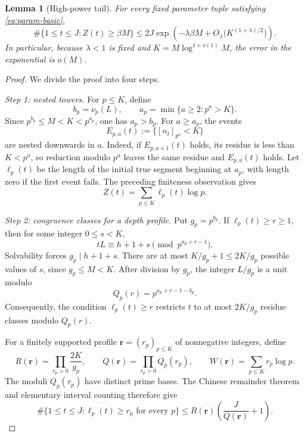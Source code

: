 \documentclass[10pt,a4paper]{amsart}
\newtheorem{lemma}{Lemma}
\begin{document}
\begin{lemma}[High-power tail]\label{lem:tail}
For every fixed parameter tuple satisfying \eqref{eq:param-basic},
\begin{equation}\label{eq:tail-bound}
 \#\{1\leq t\leq J:Z(t)\geq\beta M\}
 \leq
 2J\exp\!\left(-\lambda\beta M
       +O_\lambda\bigl(K^{(1+\lambda)/2}\bigr)\right).
\end{equation}
In particular, because \(\lambda<1\) is fixed and
\(K=M\log^{1+o(1)}M\), the error in the exponential is \(o(M)\).
\end{lemma}

\begin{proof}
We divide the proof into four steps.

\medskip
\noindent\emph{Step 1: nested towers.}
For \(p\leq K\), define
\begin{equation}\label{eq:b-a}
 b_p=\nu_p(L),
 \qquad
 a_p=\min\{a\geq2:p^a>K\}.
\end{equation}
Since \(p^{b_p}\leq M<K<p^{a_p}\), one has \(a_p>b_p\).
For \(a\geq a_p\), the events
\[
 E_{p,a}(t):=\{[n_t]_{p^a}<K\}
\]
are nested downwards in \(a\).  Indeed, if \(E_{p,a+1}(t)\) holds, its
residue is less than \(K<p^a\), so reduction modulo \(p^a\) leaves the
same residue and \(E_{p,a}(t)\) holds.  Let \(\ell_p(t)\) be the length of
the initial true segment beginning at \(a_p\), with length zero if the first
event fails.  The preceding finiteness observation gives
\begin{equation}\label{eq:Z-depth}
 Z(t)=\sum_{p\leq K}\ell_p(t)\log p.
\end{equation}

\medskip
\noindent\emph{Step 2: congruence classes for a depth profile.}
Put \(g_p=p^{b_p}\).  If \(\ell_p(t)\geq r\geq1\), then for some integer
\(0\leq s<K\),
\begin{equation}\label{eq:depth-congruence}
 tL\equiv h+1+s\pmod {p^{a_p+r-1}}.
\end{equation}
Solvability forces \(g_p\mid h+1+s\).  There are at most
\(K/g_p+1\leq2K/g_p\) possible values of \(s\), since
\(g_p\leq M<K\).  After division by \(g_p\), the integer \(L/g_p\) is a
unit modulo
\begin{equation}\label{eq:Qpr}
 Q_p(r)=p^{a_p+r-1-b_p}.
\end{equation}
Consequently, the condition \(\ell_p(t)\geq r\) restricts \(t\) to at
most \(2K/g_p\) residue classes modulo \(Q_p(r)\).

For a finitely supported profile
\(\mathbf r=(r_p)_{p\leq K}\) of nonnegative integers, define
\begin{equation}\label{eq:RQ}
 R(\mathbf r)=\prod_{r_p>0}\frac{2K}{g_p},
 \qquad
 Q(\mathbf r)=\prod_{r_p>0}Q_p(r_p),
 \qquad
 W(\mathbf r)=\sum_{p\leq K}r_p\log p.
\end{equation}
The moduli \(Q_p(r_p)\) have distinct prime bases.  The Chinese remainder
theorem and elementary interval counting therefore give
\begin{equation}\label{eq:crt-plus-one}
 \#\{1\leq t\leq J:\ell_p(t)\geq r_p\text{ for every }p\}
 \leq R(\mathbf r)\left(\frac{J}{Q(\mathbf r)}+1\right).
\end{equation}


\end{proof}
\end{document}
